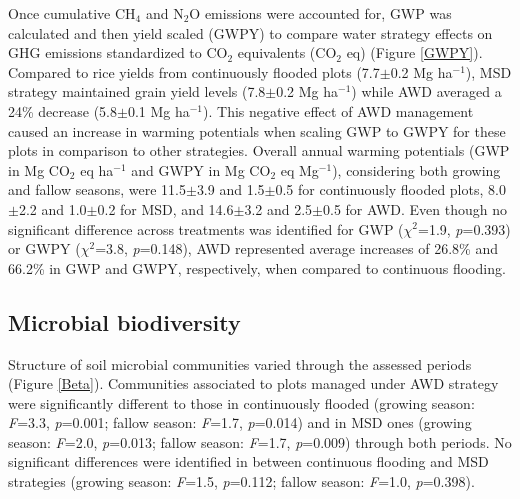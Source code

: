 Once cumulative CH$_{4}$ and N$_{2}$O emissions were accounted for, GWP was calculated and then yield scaled (GWPY) to compare water strategy effects on GHG emissions standardized to CO$_{2}$ equivalents (CO$_{2}$ eq) (Figure \ref{GWPY}). Compared to rice yields from continuously flooded plots (7.7$\pm$0.2 Mg ha$^{-1}$), MSD strategy maintained grain yield levels (7.8$\pm$0.2 Mg ha$^{-1}$) while AWD averaged a 24\% decrease (5.8$\pm$0.1 Mg ha$^{-1}$). This negative effect of AWD management caused an increase in warming potentials when scaling GWP to GWPY for these plots in comparison to other strategies. Overall annual warming potentials (GWP in Mg CO$_{2}$ eq ha$^{-1}$ and GWPY in Mg CO$_{2}$ eq Mg$^{-1}$), considering both growing and fallow seasons, were 11.5$\pm$3.9 and 1.5$\pm$0.5 for continuously flooded plots, 8.0$\pm$2.2 and 1.0$\pm$0.2 for MSD, and 14.6$\pm$3.2 and 2.5$\pm$0.5 for AWD. Even though no significant difference across treatments was identified for GWP ($\chi^2$=1.9, \textit{p}=0.393) or GWPY ($\chi^2$=3.8, \textit{p}=0.148), AWD represented average increases of 26.8\% and 66.2\% in GWP and GWPY, respectively, when compared to continuous flooding. \\ 

\subsection{Microbial biodiversity}

Structure of soil microbial communities varied through the assessed periods (Figure \ref{Beta}). Communities associated to plots managed under AWD strategy were significantly different to those in continuously flooded (growing season: \textit{F}=3.3, \textit{p}=0.001; fallow season: \textit{F}=1.7, \textit{p}=0.014) and in MSD ones (growing season: \textit{F}=2.0, \textit{p}=0.013; fallow season: \textit{F}=1.7, \textit{p}=0.009) through both periods. No significant differences were identified in between continuous flooding and MSD strategies (growing season: \textit{F}=1.5, \textit{p}=0.112; fallow season: \textit{F}=1.0, \textit{p}=0.398).\\

